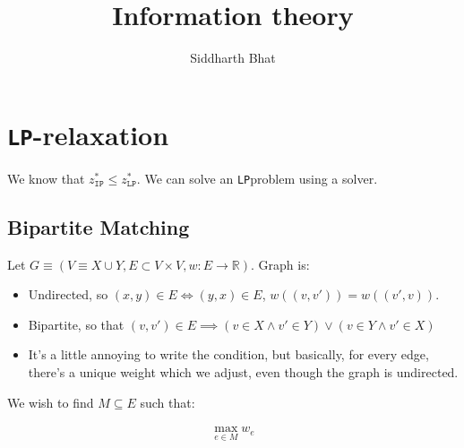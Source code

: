 \documentclass[11pt]{book}
\title{Information theory}
\author{Siddharth Bhat}
\date{}
\newcommand{\ip}{\texttt{IP} }
\newcommand{\lp}{\texttt{LP}}
\newcommand{\R}{\ensuremath{\mathbb{R}}}
\begin{document}
\maketitle
\tableofcontents

\chapter{\lp-relaxation}

We know that $z^*_\ip \leq z^*_\lp$. We can solve an \lp problem using
a solver.

\section{Bipartite Matching}
Let $G \equiv (V \equiv X \cup Y, E \subset V \times V, w: E \rightarrow \R)$. Graph is:
\begin{itemize}
    \item Undirected, so $(x, y) \in E \iff (y, x) \in E$, $w((v, v')) = w((v', v))$.
    \item Bipartite, so that $(v, v') \in E \implies (v \in X \land v'\in Y) \lor (v \in Y \land v' \in X)$
    \item It's a little annoying to write the condition, but basically, for
        every edge, there's a unique weight which we adjust, even though
        the graph is undirected.
\end{itemize}
        
        We wish to find $M \subseteq E$ such that:

\begin{align*}
\max_{e \in M} w_e \\
\end{align*}
\end{document}

